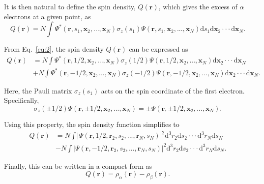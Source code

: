 \documentclass[%
 preprint, linenumbers,
 amsmath,amssymb,
 aps, physrev,
]{revtex4-2}
\begin{document}
It is then natural to define the spin density, $Q(\mathbf{r})$, which gives the excess of $\alpha$ electrons at a given point, as
\begin{equation}
    Q(\mathbf{r}) = N\int\Psi^*(\mathbf{r},s_1,\mathbf{x}_2,...,\mathbf{x}_N)\sigma_z(s_1)\Psi(\mathbf{r},s_1,\mathbf{x}_2,...,\mathbf{x}_N)\mathrm{d}s_1\mathrm{d}\mathbf{x}_2\cdot\cdot\cdot\mathrm{d}\mathbf{x}_N. 
\end{equation}

From Eq.~\eqref{eq:2}, the spin density $Q(\mathbf{r})$ can be expressed as
\begin{align*}
    Q(\mathbf{r}) &= N\int\Psi^*(\mathbf{r},1/2,\mathbf{x}_2,...,\mathbf{x}_N)\sigma_z(1/2)\Psi(\mathbf{r},1/2,\mathbf{x}_2,...,\mathbf{x}_N)\mathrm{d}\mathbf{x}_2\cdot\cdot\cdot\mathrm{d}\mathbf{x}_N \\
    &+ N\int\Psi^*(\mathbf{r},-1/2,\mathbf{x}_2,...,\mathbf{x}_N)\sigma_z(-1/2)\Psi(\mathbf{r},-1/2,\mathbf{x}_2,...,\mathbf{x}_N)\mathrm{d}\mathbf{x}_2\cdot\cdot\cdot\mathrm{d}\mathbf{x}_N. \
\end{align*}

Here, the Pauli matrix $\sigma_z(s_1)$ acts on the spin coordinate of the first electron. Specifically,
\begin{equation}
    \sigma_z(\pm 1/2)\Psi(\mathbf{r},\pm 1/2,\mathbf{x}_2,...,\mathbf{x}_N) = \pm \Psi(\mathbf{r},\pm 1/2,\mathbf{x}_2,...,\mathbf{x}_N).
\end{equation}

Using this property, the spin density function simplifies to
\begin{align*}
    Q(\mathbf{r}) &= N\int |\Psi(\mathbf{r},1/2,\mathbf{r}_2,s_2,...,\mathbf{r}_N,s_N)|^2\mathrm{d}^3r_2\mathrm{d}s_2\cdot\cdot\cdot\mathrm{d}^3r_N\mathrm{d}s_N\\
    &- N\int |\Psi(\mathbf{r},-1/2,\mathbf{r}_2,s_2,...,\mathbf{r}_N,s_N)|^2\mathrm{d}^3r_2\mathrm{d}s_2\cdot\cdot\cdot\mathrm{d}^3r_N\mathrm{d}s_N.
\end{align*}

Finally, this can be written in a compact form as
\begin{equation}
    Q(\mathbf{r}) = \rho_{\alpha}(\mathbf{r}) - \rho_{\beta}(\mathbf{r}).
\end{equation}
\end{document}
